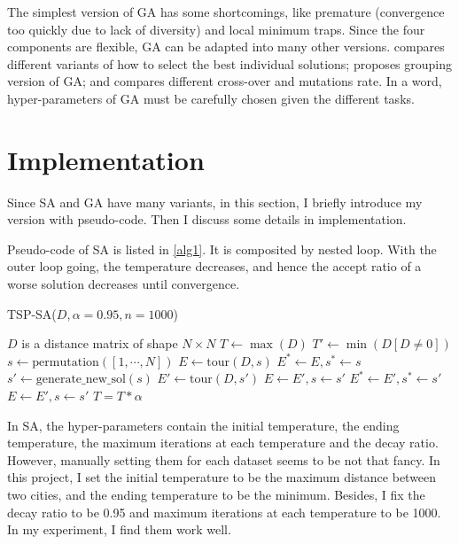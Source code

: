 \documentclass[a4paper,12pt]{article}
\begin{document}
	The simplest version of GA has some shortcomings, like premature (convergence too quickly due to lack of diversity) and local minimum traps. Since the four components are flexible, GA can be adapted into many other versions. \cite{ref9} compares different variants of how to select the best individual solutions; \cite{ref10} proposes grouping version of GA; and \cite{ref11} compares different cross-over and mutations rate. In a word, hyper-parameters of GA must be carefully chosen given the different tasks.

\section{Implementation}

	Since SA and GA have many variants, in this section, I briefly introduce my version with pseudo-code. Then I discuss some details in implementation.

	Pseudo-code of SA is listed in \ref{alg1}. It is composited by nested loop. With the outer loop going, the temperature decreases, and hence the accept ratio of a worse solution decreases until convergence.
	\newpage

	\begin{algorithm} [!htbp]
	\caption{TSP-SA($D, \alpha=0.95, n=1000$)}
	\label{alg1}
	\begin{algorithmic}
		\REQUIRE $D$ is a distance matrix of shape $N\times N$
		\STATE $T \gets \max(D)$
		\STATE $T' \gets \min(D[D\neq 0])$
		\STATE $s \gets \text{permutation}([1,\cdots,N])$
		\STATE $E \gets \text{tour}(D, s)$
		\STATE $E^* \gets E, s^* \gets s$
				\STATE $s' \gets \text{generate\_new\_sol}(s)$
				\STATE $E' \gets \text{tour}(D, s')$
					\STATE $E \gets E', s \gets s'$
						\STATE $E^* \gets E', s^* \gets s'$
					\ENDIF
				\ELSE
						\STATE $E \gets E', s \gets s'$
					\ENDIF
				\ENDIF
			\ENDFOR
			\STATE $T = T * \alpha$
		\ENDWHILE
	\end{algorithmic}
	\end{algorithm}

	In SA, the hyper-parameters contain the initial temperature, the ending temperature, the maximum iterations at each temperature and the decay ratio. However, manually setting them for each dataset seems to be not that fancy. In this project, I set the initial temperature to be the maximum distance between two cities, and the ending temperature to be the minimum. Besides, I fix the decay ratio to be 0.95 and maximum iterations at each temperature to be 1000. In my experiment, I find them work well.
\end{document}
